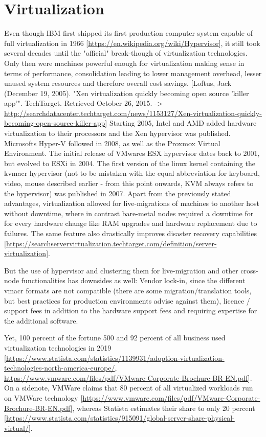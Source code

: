 \section{Virtualization}
Even though IBM first shipped its first production computer system capable of full virtualization in 1966 [\url{https://en.wikipedia.org/wiki/Hypervisor}], it still took several decades until the "official" break-though of virtualization technologies. Only then were machines powerful enough for virtualization making sense in terms of performance, consolidation leading to lower management overhead, lesser unused system resources and therefore overall cost savings. [Loftus, Jack (December 19, 2005). "Xen virtualization quickly becoming open source 'killer app'". TechTarget. Retrieved October 26, 2015. -> \url{http://searchdatacenter.techtarget.com/news/1153127/Xen-virtualization-quickly-becoming-open-source-killer-app}]
Starting 2005, Intel and AMD added hardware virtualization to their processors and the Xen hypervisor was published. Microsofts Hyper-V followed in 2008, as well as the Proxmox Virtual Environment. The initial release of VMwares ESX hypervisor dates back to 2001, but evolved to ESXi in 2004. The first version of the linux kernel containing the \gls{kvmacr} hypervisor (not to be mistaken with the equal abbreviation for keyboard, video, mouse described earlier - from this point onwards, KVM always refers to the hypervisor) was published in 2007.
Apart from the previously stated advantages, virtualization allowed for live-migrations of machines to another host without downtime, where in contrast bare-metal nodes required a downtime for for every hardware change like RAM upgrades and hardware replacement due to failures. The same feature also drastically improves disaster recovery capabilities [\url{https://searchservervirtualization.techtarget.com/definition/server-virtualization}].

But the use of hypervisor and clustering them for live-migration and other cross-node functionalities has downsides as well: Vendor lock-in, since the different \gls{vmacr} formats are not compatible (there are some migration/translation tools, but best practices for production environments advise against them), licence / support fees in addition to the hardware support fees and requiring expertise for the additional software.

Yet, 100 percent of the fortune 500 and 92 percent of all business used virtualization technologies in 2019 [\url{https://www.statista.com/statistics/1139931/adoption-virtualization-technologies-north-america-europe/}, \url{https://www.vmware.com/files/pdf/VMware-Corporate-Brochure-BR-EN.pdf}]. On a sidenote, VMWare claims that 80 percent of all virtualized workloads run on VMWare technology [\url{https://www.vmware.com/files/pdf/VMware-Corporate-Brochure-BR-EN.pdf}], whereas Statista estimates their share to only 20 percent [\url{https://www.statista.com/statistics/915091/global-server-share-physical-virtual/}].

